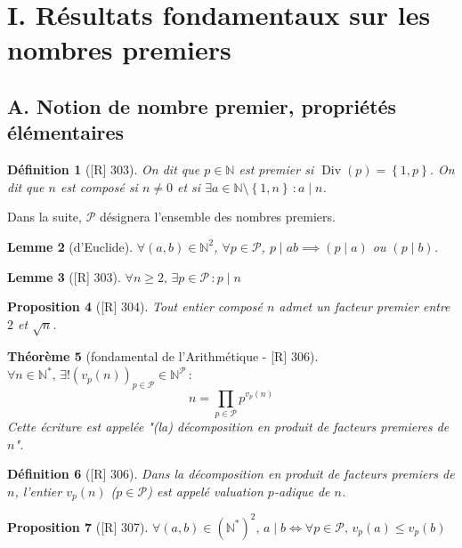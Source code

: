 \documentclass[10pt, a4paper, parskip=full, twoside, twocolumn]{report}
\newtheorem{definition}{Définition}
\newtheorem{theorem}[definition]{Théorème}
\newtheorem{proposition}[definition]{Proposition}
\newtheorem{lemma}[definition]{Lemme}
\newcommand{\IN}{\mathbb{N}}
\DeclareMathOperator{\Div}{Div}
\begin{document}
\section*{I. Résultats fondamentaux sur les nombres premiers}
\subsection*{A. Notion de nombre premier, propriétés élémentaires}

\begin{definition}[\textnormal{[R] 303}]
	On dit que $p\in\IN$ est \emph{premier} si $\Div(p)=\left\{1,p\right\}$.
	On dit que $n$ est \emph{composé} si $n\neq 0$ et si $\exists a\in\IN\setminus\left\{1,n\right\}\,\colon a\mid n$.
\end{definition}

Dans la suite, $\mathcal{P}$ désignera l'ensemble des nombres premiers.

\begin{lemma}[d'Euclide]
	$\forall(a,b)\in\IN^2$, $\forall p\in\mathcal{P}$, $p\mid ab \implies (p\mid a)$ ou $(p\mid b)$.
\end{lemma}

\begin{lemma}[\textnormal{[R] 303}]
	$\forall n\geq 2,\, \exists p\in\mathcal{P}\,\colon p\mid n$
\end{lemma}

\begin{proposition}[\textnormal{[R] 304}]
	Tout entier composé $n$ admet un facteur premier entre $2$ et $\sqrt{n}$.
\end{proposition}

\begin{theorem}[fondamental de l'Arithmétique - \textnormal{[R] 306}]
	$\forall n\in\IN^*,\,\exists ! \left(v_p(n)\right)_{p\in\mathcal{P}}\in\IN^{\mathcal{P}} \,\colon$ 
	$$n = \prod_{p\in\mathcal{P}} p^{v_p(n)}$$
	Cette écriture est appelée \emph{"(la) décomposition en produit de facteurs premieres de $n$"}.
\end{theorem}

\begin{definition}[\textnormal{[R] 306}]
	Dans la décomposition en produit de facteurs premiers de $n$, l'entier $v_p(n)$ ($p\in\mathcal{P}$) est appelé \emph{valuation $p$-adique de $n$}.
\end{definition}

\begin{proposition}[\textnormal{[R] 307}]
	$\forall(a,b)\in\left(\IN^*\right)^2,\, a\mid b\iff \forall p\in\mathcal{P},\, v_p(a)\leq v_p(b)$
\end{proposition}
\end{document}
